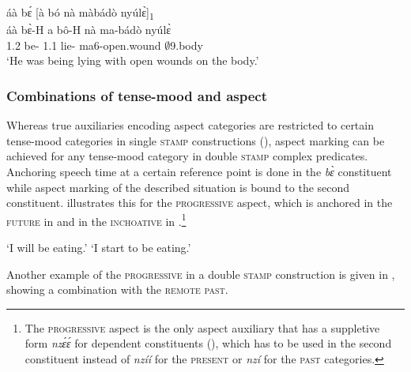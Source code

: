 \ea\label{embed4}
  \glll áà bɛ́ [à bó nà màbádò nyúlɛ̀]\textsubscript{{\PST}1} \\
        áà bɛ̀-H {\db}a bô-H nà ma-bádò nyúlɛ̀ \\
        1.{\PST}2 be-{\R} {\db}1.{\PST}1 lie-{\R} {\COM} ma6-open.wound $\emptyset$9.body\\
    \trans `He was being lying with open wounds on the body.'
\z



\subsubsection*{Combinations of tense-mood and aspect}

Whereas true auxiliaries encoding aspect categories are restricted to certain tense-mood categories in single \textsc{stamp} constructions (), aspect marking can be achieved for any tense-mood category in double \textsc{stamp} complex predicates. Anchoring speech time at a certain reference point is done in the {\itshape bɛ̀} constituent while aspect marking of the described situation is bound to the second constituent.
 illustrates this for the \textsc{progressive} aspect, which is anchored in the \textsc{future} in  and in the \textsc{inchoative} in .\footnote{The \textsc{progressive} aspect is the only aspect auxiliary that has a suppletive form {\itshape nzɛ́ɛ́} for dependent constituents (), which has to be used in the second constituent instead of {\itshape nzíí} for the \textsc{present} or {\itshape nzí} for the \textsc{past} categories.}

\ea\label{sub}
\jambox*{({\FUT} - {\PROG})}
    \trans `I will be eating.'
\jambox*{({\INCH} - {\PROG})}
    \trans `I start to be eating.'
\z
\z

\noindent Another example of the \textsc{progressive} in a double \textsc{stamp} construction is given in , showing a combination with the \textsc{remote past}.

